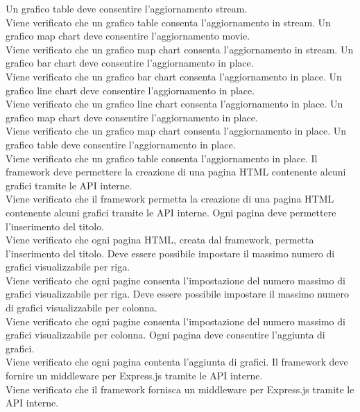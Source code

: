  Un grafico table deve consentire l'aggiornamento stream.\\
Viene verificato che un grafico table consenta l'aggiornamento in stream.
 Un grafico map chart deve consentire l'aggiornamento movie.\\
Viene verificato che un grafico map chart consenta l'aggiornamento in stream.
 Un grafico bar chart deve consentire l'aggiornamento in place.\\
Viene verificato che un grafico bar chart consenta l'aggiornamento in place.
 Un grafico line chart deve consentire l'aggiornamento in place.\\
Viene verificato che un grafico line chart consenta l'aggiornamento in place.
 Un grafico map chart deve consentire l'aggiornamento in place.\\
Viene verificato che un grafico map chart consenta l'aggiornamento in place.
 Un grafico table deve consentire l'aggiornamento in place.\\
Viene verificato che un grafico table consenta l'aggiornamento in place.
 Il framework deve permettere la creazione di una pagina HTML contenente alcuni grafici tramite le API interne.\\
Viene verificato che il framework permetta la creazione di una pagina HTML contenente alcuni grafici tramite le API interne.
 Ogni pagina deve permettere l'inserimento del titolo.\\
Viene verificato che ogni pagina HTML, creata dal framework, permetta l'inserimento del titolo.
 Deve essere possibile impostare il massimo numero di grafici visualizzabile per riga.\\
Viene verificato che ogni pagine consenta l'impostazione del numero massimo di grafici visualizzabile per riga.
 Deve essere possibile impostare il massimo numero di grafici visualizzabile per colonna.\\
Viene verificato che ogni pagine consenta l'impostazione del numero massimo di grafici visualizzabile per colonna.
 Ogni pagina deve consentire l'aggiunta di grafici.\\
Viene verificato che ogni pagina contenta l'aggiunta di grafici.
 Il framework deve fornire un middleware per Express.js tramite le API interne.\\
Viene verificato che il framework fornisca un middleware per Express.js tramite le API interne.
